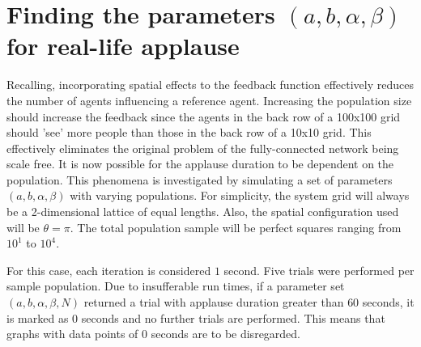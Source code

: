 \section{Finding the parameters $(a,b,\alpha,\beta)$ for real-life applause}

\hspace{\parindent}Recalling, incorporating spatial effects to the feedback function effectively reduces the number of agents influencing a reference agent. Increasing the population size should increase the feedback since the agents in the back row of a 100x100 grid should 'see' more people than those in the back row of a 10x10 grid. 
This effectively eliminates the original problem of the fully-connected network being scale free.
It is now possible for the applause duration to be dependent on the population.
This phenomena is investigated by simulating a set of parameters $(a,b,\alpha,\beta)$ with varying populations.
For simplicity, the system grid will always be a 2-dimensional lattice of equal lengths.
Also, the spatial configuration used will be $\theta = \pi$.
The total population sample will be perfect squares ranging from $10^1$ to $10^4$.


For this case, each iteration is considered  $1$ second.
Five trials were performed per sample population.
Due to insufferable run times, if a parameter set $(a,b,\alpha,\beta,N)$ returned a trial with applause duration greater than $60$ seconds, it is marked as $0$ seconds and no further trials are performed.
This means that graphs with data points of $0$ seconds are to be disregarded.

